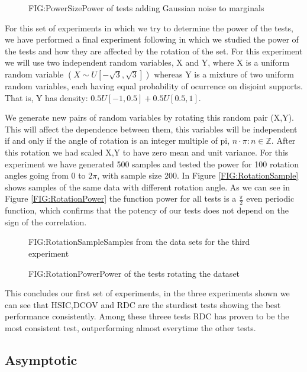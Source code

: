 \begin{figure}[Power of tests increasing sample size]{FIG:PowerSize}{Power of tests adding Gaussian noise to marginals}
\end{figure}
\FloatBarrier
For this set of experiments in which we try to determine the power of the tests, we have performed a final experiment following \cite{Size} in which we studied the power of the tests and how they are affected by the rotation of the set.
For this experiment we will use two independent random variables, X and Y, where X is a uniform random variable $(X\sim U[-\sqrt{3},\sqrt{3}])$ whereas Y is a mixture of two uniform random variables, each having equal probability of ocurrence on disjoint supports. That is, Y has density: $0.5U[-1,0.5] + 0.5U[0.5,1]$.

We generate new pairs of random variables by rotating this random pair (X,Y). This will affect the dependence between them, this variables will be independent if and only if the angle of rotation is an integer multiple of pi, $n\cdot\pi : n\in\mathbb{Z}$. After this rotation we had scaled X,Y to have zero mean and unit variance.
For this experiment we have generated 500 samples and tested the power for 100 rotation angles going from 0 to $2\pi$, with sample size 200. In Figure \ref{FIG:RotationSample} shows samples of the same data with different rotation angle.
As we can see in Figure \ref{FIG:RotationPower} the function power for all tests is a $\frac{\pi}{2}$ even periodic function, which confirms that the potency of our tests does not depend on the sign of the correlation.
\FloatBarrier
\begin{figure}[Experiment 3 rotation pattern sample]{FIG:RotationSample}{Samples from the data sets for the third experiment}
\end{figure}
\begin{figure}[Experiment 3 results]{FIG:RotationPower}{Power of the tests rotating the dataset}
\end{figure}
\FloatBarrier
This concludes our first set of experiments, in the three experiments shown we can see that HSIC,DCOV and RDC are the sturdiest tests showing the best performance consistently. Among these threee tests RDC has proven to be the most consistent test, outperforming almost everytime the other tests. 


\subsection{Asymptotic}

